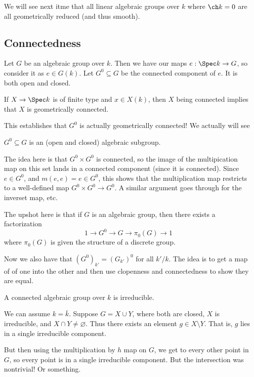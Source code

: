 \documentclass[12pt]{article}
\begin{document}
We will see next itme that all linear algebraic groups over $k$ where $\ch k=0$ are all 
geometrically reduced (and thus smooth).

\subsection{Connectedness}
Let $G$ be an algebraic group over $k$. Then we have our maps $e:\Spec k\to G$, so consider it as $e\in G(k)$.
Let $G^0\subseteq G$ be the connected component of $e$. It is both open and closed.
\begin{rmk}
	If $X\to \Spec k$ is of finite type and $x\in X(k)$, then $X$ being connected implies that $X$ is geometrically connected.
\end{rmk}
This establishes that $G^0$ is actually geometrically connected! We actually will see
\begin{prop}
	$G^0\subseteq G$ is an (open and closed) algebraic subgroup.
\end{prop}
The idea here is that $G^0\times G^0$ is connected, so the image of the multipication map on this set lands in a connected component (since it is connected).
Since $e\in G^0$, and $m(e,e)=e\in G^0$, this shows that the multiplication map restricts to a well-defined map $G^0\times G^0\to G^0$. A similar argument 
goes through for the inverset map, etc.

The upshot here is that if $G$ is an algebraic group, then there exists a factorization 
\[1\to G^0\to G\to \pi_0(G)\to 1\]
where $\pi_0(G)$ is given the structure of a discrete group.
\begin{rmk}
	Now we also have that $(G^0)_{k'}=(G_{k'})^0$ for all $k'/k$. The idea is to get a map of of one into the other and then use clopenness and connectedness 
	to show they are equal.
\end{rmk}

\begin{prop}
	A connected algebraic group over $k$ is irreducible.
\end{prop}
\begin{prf}
	We can assume $k=\bar k$. Suppose $G= X\cup Y$, where both are closed, $X$ is irreducible, 
	and $X\cap Y\ne\varnothing$. Thus there exists an element $g\in X\setminus Y$. That is, $g$ lies in a single irreducible component.

	But then using the multiplication by $h$ map on $G$, we get to every other point in $G$, so every point 
	is in a single irreducible component. But the intersection was nontrivial! Or something.
\end{prf}
\end{document}
